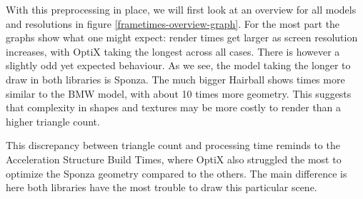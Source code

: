 With this preprocessing in place, we will first look at an overview for all models and resolutions in figure \ref{frametimes-overview-graph}. For the most part the graphs show what one might expect: render times get larger as screen resolution increases, with OptiX taking the longest across all cases. There is however a slightly odd yet expected behaviour. As we see, the model taking the longer to draw in both libraries is Sponza. The much bigger Hairball shows times more similar to the BMW model, with about 10 times more geometry. This suggests that complexity in shapes and textures may be more costly to render than a higher triangle count. 

This discrepancy between triangle count and processing time reminds to the Acceleration Structure Build Times, where OptiX also struggled the most to optimize the Sponza geometry compared to the others. The main difference is here both libraries have the most trouble to draw this particular scene.

